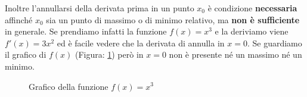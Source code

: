 Inoltre l'annullarsi della derivata prima in un punto $x_0$ è condizione \textbf{necessaria} affinché $x_0$ sia un punto di massimo o di minimo relativo, ma \textbf{non è sufficiente} in generale. Se prendiamo infatti la funzione $f(x) = x^3$ e la deriviamo viene $f'(x) = 3x^2$ ed è facile vedere che la derivata di annulla in $x = 0$. Se guardiamo il grafico di $f(x)$ (Figura: \ref{fig_graficoXTree}) però in $x= 0$ non è presente né un massimo né un minimo.

\begin{figure}[h]
\centering
{}
	\caption{Grafico della funzione $f(x) = x^3$}
	\label{fig_graficoXTree}
\end{figure}
	

